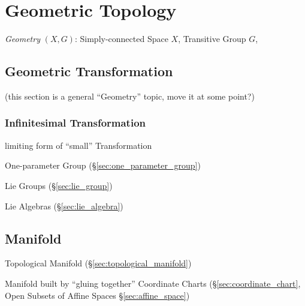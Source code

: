 \section{Geometric Topology}\label{sec:geometric_topology}

\emph{Geometry} $(X,G)$: Simply-connected Space $X$, Transitive Group $G$,



\subsection{Geometric Transformation}
\label{sec:geometric_transformation}


(this section is a general ``Geometry'' topic, move it at some point?)



\subsubsection{Infinitesimal Transformation}
\label{sec:infinitesimal_transformation}

limiting form of ``small'' Transformation

One-parameter Group (\S\ref{sec:one_parameter_group})

Lie Groups (\S\ref{sec:lie_group})

Lie Algebras (\S\ref{sec:lie_algebra})



\subsection{Manifold}\label{sec:manifold}



\fist Topological Manifold (\S\ref{sec:topological_manifold})

Manifold built by ``gluing together'' Coordinate Charts
(\S\ref{sec:coordinate_chart}, Open Subsets of Affine Spaces
\S\ref{sec:affine_space})

